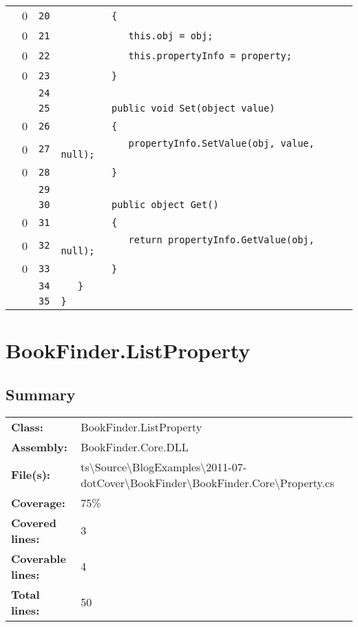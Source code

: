 \documentclass[a4paper,10pt]{article}
\begin{document}
\begin{longtable}[l]{lrrl}
\cellcolor{red} & 0 & \verb~20~ & \verb~         {~\\
\cellcolor{red} & 0 & \verb~21~ & \verb~            this.obj = obj;~\\
\cellcolor{red} & 0 & \verb~22~ & \verb~            this.propertyInfo = property;~\\
\cellcolor{red} & 0 & \verb~23~ & \verb~         }~\\
\cellcolor{gray} &  & \verb~24~ & \verb~~\\
\cellcolor{gray} &  & \verb~25~ & \verb~         public void Set(object value)~\\
\cellcolor{red} & 0 & \verb~26~ & \verb~         {~\\
\cellcolor{red} & 0 & \verb~27~ & \verb~            propertyInfo.SetValue(obj, value, null);~\\
\cellcolor{red} & 0 & \verb~28~ & \verb~         }~\\
\cellcolor{gray} &  & \verb~29~ & \verb~~\\
\cellcolor{gray} &  & \verb~30~ & \verb~         public object Get()~\\
\cellcolor{red} & 0 & \verb~31~ & \verb~         {~\\
\cellcolor{red} & 0 & \verb~32~ & \verb~            return propertyInfo.GetValue(obj, null);~\\
\cellcolor{red} & 0 & \verb~33~ & \verb~         }~\\
\cellcolor{gray} &  & \verb~34~ & \verb~   }~\\
\cellcolor{gray} &  & \verb~35~ & \verb~}~\\
\end{longtable}
\newpage
\section{BookFinder.ListProperty}
\subsection{Summary}
\begin{longtable}[l]{ll}
\textbf{Class:} & BookFinder.ListProperty\\
\textbf{Assembly:} & BookFinder.Core.DLL\\
\textbf{File(s):} & \begin{minipage}[t]{12cm}{ts\textbackslash Source\textbackslash BlogExamples\textbackslash 2011-07-dotCover\textbackslash BookFinder\textbackslash BookFinder.Core\textbackslash Property.cs}\end{minipage} \\
\textbf{Coverage:} & 75\%\\
\textbf{Covered lines:} & 3\\
\textbf{Coverable lines:} & 4\\
\textbf{Total lines:} & 50\\
\end{longtable}
\end{document}
